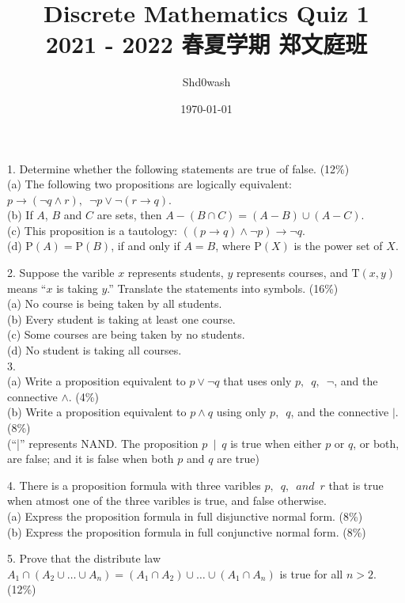 \documentclass{article}
\title{Discrete Mathematics Quiz 1\\\small{2021 - 2022 \enspace 春夏学期 \enspace 郑文庭班}}
\author{Shd0wash}
\date{\today}
\begin{document}
\maketitle

1. Determine whether the following statements are true of false. (12\%)\\
(a) The following two propositions are logically equivalent: $p \rightarrow (\neg q \wedge r), \enspace \neg p \vee \neg(r \rightarrow q)$.\\
(b) If $A$, $B$ and $C$ are sets, then $A - (B \cap C) = (A - B) \cup (A - C)$.\\
(c) This proposition is a tautology: $((p \rightarrow q) \wedge \neg p) \rightarrow \neg q$.\\
(d) $\mathrm{P}(A) = \mathrm{P}(B)$, if and only if $A = B$, where $\mathrm{P}(X)$ is the power set of $X$.

2. Suppose the varible $x$ represents students, $y$ represents courses, and $\mathrm{T}(x,y)$ means ``$x$ is taking $y$.'' 
Translate the statements into symbols. (16\%)\\
(a) No course is being taken by all students.\\
(b) Every student is taking at least one course.\\
(c) Some courses are being taken by no students.\\
(d) No student is taking all courses.\\

3.\\
(a) Write a proposition equivalent to $p \vee \neg q$ that uses only $p, \enspace q, \enspace \neg$, and the connective $\wedge$. (4\%)\\
(b) Write a proposition equivalent to $p \wedge q$ using only $p, \enspace q$, and the connective $|$. (8\%)\\
(``|'' represents NAND. The proposition $p \enspace | \enspace q$ is true when either $p$ or $q$, or both, are false; and it is false when both $p$ and $q$ are true)

4. There is a proposition formula with three varibles $p, \enspace q, \enspace and \enspace r$ that is true when atmost one of the three varibles is true, 
and false otherwise.\\
(a) Express the proposition formula in full disjunctive normal form. (8\%)\\
(b) Express the proposition formula in full conjunctive normal form. (8\%)

5. Prove that the distribute law $A_{1} \cap (A_{2} \cup \ldots \cup A_{n}) = (A_{1} \cap A_{2}) \cup \ldots \cup (A_{1} \cap A_{n})$ is true for all $n>2$. 
(12\%)
\end{document}
